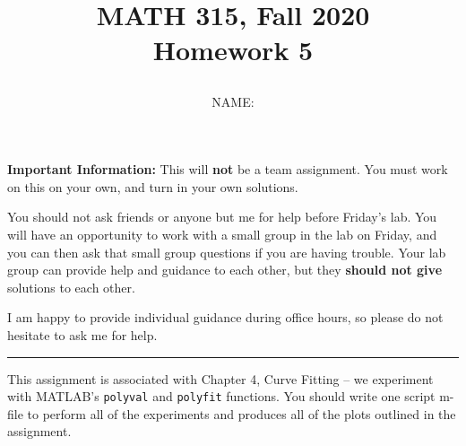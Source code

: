 \documentclass[12pt]{article}
\title{MATH 315, Fall 2020 \\[3pt]
Homework 5
\date{}}
\author{NAME: }
\begin{document}
\maketitle

{\bf Important Information:} This will {\bf not} be a team assignment. You must work on this on your own, and turn in your own solutions.  

You should not ask friends or anyone but me for help before Friday's lab. You will have an opportunity to work with a small group in the lab on Friday, and you can then ask that small group questions if you are having trouble. Your lab group can provide help and guidance to each other, but they {\bf should not give} solutions to each other. 

I am happy to provide individual guidance during office hours, so please do not hesitate to ask me for help.

\begin{center}
\rule[0pt]{12cm}{1pt}
\end{center}


This assignment is associated with Chapter 4, Curve Fitting -- we experiment with MATLAB's {\tt polyval} and {\tt polyfit} functions.
You should write one script m-file to perform all of the experiments and produces all of the plots outlined in the assignment.
\end{document}
